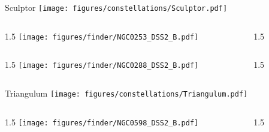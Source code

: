 \documentclass[final]{beamer}
\newlength{\colwidth}
\begin{document}

\begin{frame}[t]{\LARGE Sculptor}
    \centering
    \texttt{[image: figures/constellations/Sculptor.pdf]}
\end{frame}


\begin{frame}[t]{}
    \begin{columns}[T]
        \begin{column}{1.5\colwidth}
            \centering
            \texttt{[image: figures/finder/NGC0253\_DSS2\_B.pdf]}
        \end{column}
        \begin{column}{1.5\colwidth}
            \Large
            
        \end{column}
    \end{columns}
    \vspace{\fill}
    \begin{columns}[T]
        \begin{column}{1.5\colwidth}
            \centering
            \texttt{[image: figures/finder/NGC0288\_DSS2\_B.pdf]}
        \end{column}
        \begin{column}{1.5\colwidth}
            \Large
            
        \end{column}
    \end{columns}
\end{frame}


\begin{frame}[t]{\LARGE Triangulum}
    \centering
    \texttt{[image: figures/constellations/Triangulum.pdf]}
\end{frame}


\begin{frame}[t]{}
    \begin{columns}[T]
        \begin{column}{1.5\colwidth}
            \centering
            \texttt{[image: figures/finder/NGC0598\_DSS2\_B.pdf]}
        \end{column}
        \begin{column}{1.5\colwidth}
     \Large
     
     \end{column}
  \end{columns}
  \vspace{\fill}
\end{frame}
\end{document}
